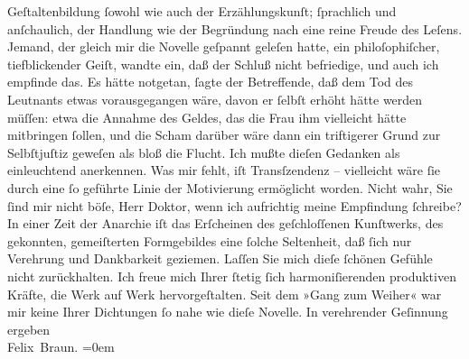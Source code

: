 \begin{ledgroupsized}[t]{13cm}
               Geſtaltenbildung ſowohl wie auch der Erzählungskunſt; ſprachlich und anſchaulich, der
                  Hand{\pb}lung wie der
               Begründung nach eine reine Freude des Leſens.\pend
           \pstart
           Jemand, der gleich mir die
                  Novelle geſpannt geleſen
               hatte, ein philoſophiſcher, tiefblickender Geiſt, wandte ein, daß der Schluß nicht
               befriedige, und auch ich empfinde das. Es hätte notgetan, ſagte der Betreffende, daß dem Tod des
               Leutnants etwas vorausgegangen wäre, davon er ſelbſt erhöht hätte werden müſſen: etwa
               die Annahme des Geldes, das die Frau ihm vielleicht hätte mitbringen ſollen, und die
               Scham darüber wäre dann ein triftigerer Grund zur Selbſtjuſtiz geweſen als bloß die
               Flucht. Ich {\pb}mußte
               dieſen Gedanken als einleuchtend anerkennen. Was mir fehlt, iſt Transſzendenz –
               vielleicht wäre ſie durch eine ſo geführte Linie der Motivierung ermöglicht worden.
               Nicht wahr, Sie ſind mir nicht böſe, Herr Doktor, wenn ich aufrichtig meine
               Empfindung ſchreibe?\pend
           \pstart
           In einer Zeit der Anarchie iſt das Erſcheinen des geſchloſſenen Kunſtwerks, des
               gekonnten, gemeiſterten Formgebildes eine ſolche Seltenheit, daß ſich nur Verehrung
               und Dankbarkeit geziemen. Laſſen Sie mich dieſe ſchönen Gefühle nicht zurückhalten.
               Ich freue mich Ihrer ſtetig ſich harmoni{\pb}ſierenden produktiven
               Kräfte, die Werk auf Werk hervorgeſtalten. Seit dem »Gang zum Weiher« war mir keine Ihrer Dichtungen ſo nahe wie dieſe Novelle.\pend
           \pstart
           In verehrender Geſinnung ergeben{\\[\baselineskip]}\spacefill\mbox{Felix Braun.}\pend
           \leftskip=0em{}
         
         \endnumbering{}\end{ledgroupsized}  \newcommand{\dateiname}{L02486}\newcommand{\titel}{Felix Braun an Arthur Schnitzler, 10. 5. 1927}\newcommand{\editorInnen}{Martin Anton Müller und Gerd-Hermann Susen}
      